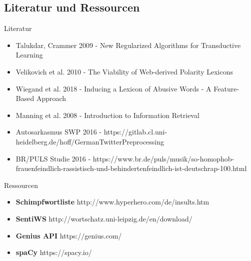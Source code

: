 \documentclass{beamer}
\begin{document}
\subsection[Lit. + Res.]{Literatur und Ressourcen}


\begin{frame}{Literatur}
\begin{itemize}
\item Talukdar, Crammer 2009 - New Regularized Algorithms for Transductive Learning
\item Velikovich et al. 2010 - The Viability of Web-derived Polarity Lexicons
\item Wiegand et al. 2018 - Inducing a Lexicon of Abusive Words - A Feature-Based Approach
\item Manning et al. 2008 - Introduction to Information Retrieval
\item Autosarkasmus SWP 2016 - https://gitlab.cl.uni-heidelberg.de/hoff/GermanTwitterPreprocessing
\item BR/PULS Studie 2016 - https://www.br.de/puls/musik/so-homophob-frauenfeindlich-rassistisch-und-behindertenfeindlich-ist-deutschrap-100.html
\end{itemize}
\end{frame}

\begin{frame}{Ressourcen}
\begin{itemize}
\item \textbf{Schimpfwortliste} http://www.hyperhero.com/de/insults.htm
\item \textbf{SentiWS} http://wortschatz.uni-leipzig.de/en/download/
\item \textbf{Genius API} https://genius.com/
\item \textbf{spaCy} https://spacy.io/
\end{itemize}
\end{frame}
\end{document}
